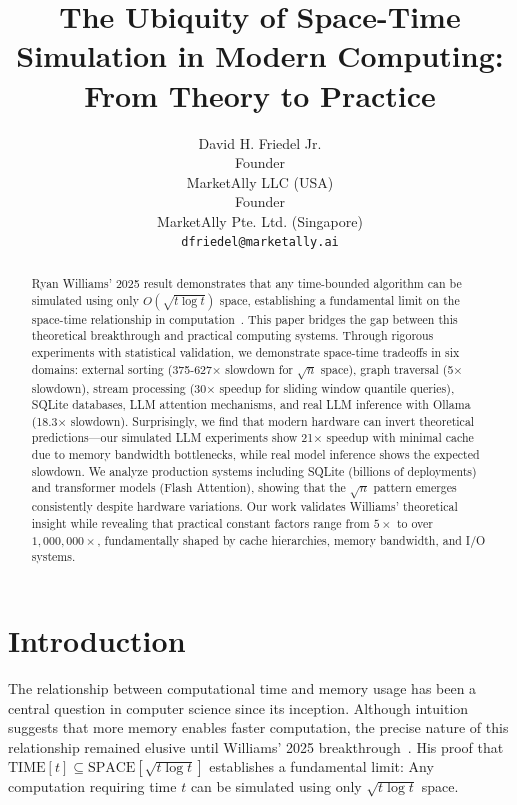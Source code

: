 \documentclass[11pt]{article}
\title{The Ubiquity of Space-Time Simulation in Modern Computing: From Theory to Practice}
\author{
David H. Friedel Jr.\\
Founder \\ MarketAlly LLC (USA) \\ Founder \\ MarketAlly Pte. Ltd. (Singapore) \\ 
\texttt{dfriedel@marketally.ai}
}
\date{}
\theoremstyle{definition}
\begin{document}
\maketitle

\begin{center}
\setlength{\fboxsep}{8pt}
\noindent{}
\end{center}
\vspace{1em}

\begin{abstract}
Ryan Williams' 2025 result demonstrates that any time-bounded algorithm can be simulated using only $O(\sqrt{t \log t})$ space, establishing a fundamental limit on the space-time relationship in computation~\cite{williams2025}. This paper bridges the gap between this theoretical breakthrough and practical computing systems. Through rigorous experiments with statistical validation, we demonstrate space-time tradeoffs in six domains: external sorting (375-627× slowdown for $\sqrt{n}$ space), graph traversal (5× slowdown), stream processing (30× speedup for sliding window quantile queries), SQLite databases, LLM attention mechanisms, and real LLM inference with Ollama (18.3× slowdown). Surprisingly, we find that modern hardware can invert theoretical predictions—our simulated LLM experiments show 21× speedup with minimal cache due to memory bandwidth bottlenecks, while real model inference shows the expected slowdown. We analyze production systems including SQLite (billions of deployments) and transformer models (Flash Attention), showing that the $\sqrt{n}$ pattern emerges consistently despite hardware variations. Our work validates Williams' theoretical insight while revealing that practical constant factors range from $5\times$ to over $1{,}000{,}000\times$, fundamentally shaped by cache hierarchies, memory bandwidth, and I/O systems.
\end{abstract}

\section{Introduction}

The relationship between computational time and memory usage has been a central question in computer science since its inception. Although intuition suggests that more memory enables faster computation, the precise nature of this relationship remained elusive until Williams' 2025 breakthrough~\cite{williams2025}. His proof that $\text{TIME}[t] \subseteq \text{SPACE}[\sqrt{t \log t}]$ establishes a fundamental limit: Any computation requiring time $t$ can be simulated using only $\sqrt{t \log t}$ space.
\end{document}
